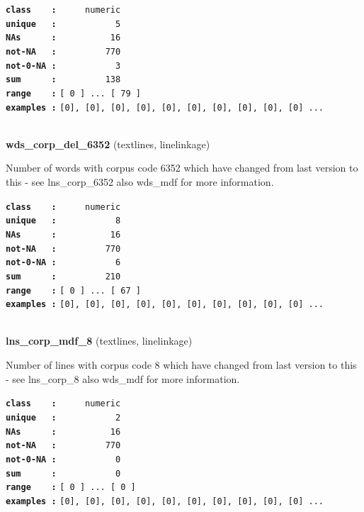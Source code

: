 \documentclass[]{article}
\begin{document}
\textbf{\texttt{class\ \ \ \ :}} \texttt{~~~~~numeric}\\
\textbf{\texttt{unique\ \ \ :}} \texttt{~~~~~~~~~~~5}\\
\textbf{\texttt{NAs\ \ \ \ \ \ :}} \texttt{~~~~~~~~~~16}\\
\textbf{\texttt{not-NA\ \ \ :}} \texttt{~~~~~~~~~770}\\
\textbf{\texttt{not-0-NA\ :}} \texttt{~~~~~~~~~~~3}\\
\textbf{\texttt{sum\ \ \ \ \ \ :}} \texttt{~~~~~~~~~138}\\
\textbf{\texttt{range\ \ \ \ :}}
\texttt{{[}\ 0\ {]}\ ...\ {[}\ 79\ {]}}\\
\textbf{\texttt{examples\ :}}
\texttt{{[}0{]},\ {[}0{]},\ {[}0{]},\ {[}0{]},\ {[}0{]},\ {[}0{]},\ {[}0{]},\ {[}0{]},\ {[}0{]},\ {[}0{]}\ ...}\\

~

\textbf{wds\_corp\_del\_6352} (textlines, linelinkage)

Number of words with corpus code 6352 which have changed from last
version to this - see lns\_corp\_6352 also wds\_mdf for more
information.

\textbf{\texttt{class\ \ \ \ :}} \texttt{~~~~~numeric}\\
\textbf{\texttt{unique\ \ \ :}} \texttt{~~~~~~~~~~~8}\\
\textbf{\texttt{NAs\ \ \ \ \ \ :}} \texttt{~~~~~~~~~~16}\\
\textbf{\texttt{not-NA\ \ \ :}} \texttt{~~~~~~~~~770}\\
\textbf{\texttt{not-0-NA\ :}} \texttt{~~~~~~~~~~~6}\\
\textbf{\texttt{sum\ \ \ \ \ \ :}} \texttt{~~~~~~~~~210}\\
\textbf{\texttt{range\ \ \ \ :}}
\texttt{{[}\ 0\ {]}\ ...\ {[}\ 67\ {]}}\\
\textbf{\texttt{examples\ :}}
\texttt{{[}0{]},\ {[}0{]},\ {[}0{]},\ {[}0{]},\ {[}0{]},\ {[}0{]},\ {[}0{]},\ {[}0{]},\ {[}0{]},\ {[}0{]}\ ...}\\

~

\textbf{lns\_corp\_mdf\_8} (textlines, linelinkage)

Number of lines with corpus code 8 which have changed from last version
to this - see lns\_corp\_8 also wds\_mdf for more information.

\textbf{\texttt{class\ \ \ \ :}} \texttt{~~~~~numeric}\\
\textbf{\texttt{unique\ \ \ :}} \texttt{~~~~~~~~~~~2}\\
\textbf{\texttt{NAs\ \ \ \ \ \ :}} \texttt{~~~~~~~~~~16}\\
\textbf{\texttt{not-NA\ \ \ :}} \texttt{~~~~~~~~~770}\\
\textbf{\texttt{not-0-NA\ :}} \texttt{~~~~~~~~~~~0}\\
\textbf{\texttt{sum\ \ \ \ \ \ :}} \texttt{~~~~~~~~~~~0}\\
\textbf{\texttt{range\ \ \ \ :}}
\texttt{{[}\ 0\ {]}\ ...\ {[}\ 0\ {]}}\\
\textbf{\texttt{examples\ :}}
\texttt{{[}0{]},\ {[}0{]},\ {[}0{]},\ {[}0{]},\ {[}0{]},\ {[}0{]},\ {[}0{]},\ {[}0{]},\ {[}0{]},\ {[}0{]}\ ...}\\
\end{document}
